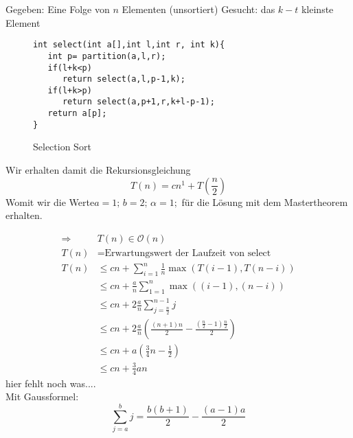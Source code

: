 Gegeben: Eine Folge von $n$ Elementen (unsortiert)
Gesucht: das $k-t$ kleinste Element
\begin{figure}[H]
\begin{verbatim}
int select(int a[],int l,int r, int k){
   int p= partition(a,l,r);
   if(l+k<p) 
      return select(a,l,p-1,k);
   if(l+k>p) 
      return select(a,p+1,r,k+l-p-1);
   return a[p];
}
\end{verbatim}
\caption{Selection Sort}
\end{figure}
Wir erhalten damit die Rekursionsgleichung
\[T(n)=cn^1+T(\frac{n}{2})\]
Womit wir die Werte$a=1;\, b=2;\,\alpha=1;$ für die Lösung mit dem Mastertheorem erhalten.

\begin{align*}
\Rightarrow& T(n)\in \mathcal O(n)\\
T(n)&=\mbox{Erwartungswert der Laufzeit von select}\\
T(n)&\le cn+\sum_{i=1}^n\frac{1}{n}\max\left(T(i-1),T(n-i)\right)\\
&\le cn+\frac{a}{n}\sum_{1=1}^n\max\left((i-1),(n-i)\right)\\
&\le cn+2\frac{a}{n}\sum_{j=\frac{n}{2}}^{n-1}j\\
&\le cn+2\frac{a}{n}\left(\frac{(n+1)n}{2}-\frac{(\frac{n}{2}-1)\frac{n}{2}}{2}\right)\\
&\le cn+a\left(\frac{3}{4}n-\frac{1}{2}\right)\\
&\le cn+\frac{3}{4}an
\end{align*}
hier fehlt noch was....\\
Mit Gaussformel:
$$\sum_{j=a}^bj=\frac{b(b+1)}{2}- \frac{(a-1)a}{2}$$
